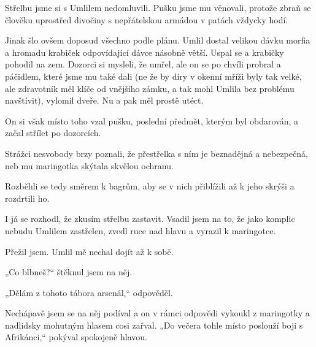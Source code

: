 	
 Střelbu jsme si s Umlilem nedomluvili. Pušku jsme mu věnovali, protože zbraň se člověku uprostřed divočiny s nepřátelskou armádou v patách vždycky hodí.
	
 Jinak šlo ovšem doposud všechno podle plánu. Umlil dostal velikou dávku morfia a hromadu krabiček odpovídající dávce násobně větší. Uspal se a krabičky pohodil na zem. Dozorci si mysleli, že umřel, ale on se po chvíli probral a páčidlem, které jsme mu také dali (ne že by díry v okenní mříži byly tak velké, ale zdravotník měl klíče od vnějšího zámku, a tak mohl Umlila bez problému navštívit), vylomil dveře. Nu a pak měl prostě utéct.

On si však místo toho vzal pušku, poslední předmět, kterým byl obdarován, a začal střílet po dozorcích.
	
 Strážci nesvobody brzy poznali, že přestřelka s ním je beznadějná a nebezpečná, neb mu maringotka skýtala skvělou ochranu.
	
 Rozběhli se tedy směrem k bagrům, aby se v nich přiblížili až k jeho skrýši a rozdrtili ho.

	
 I já se rozhodl, že zkusím střelbu zastavit. Vsadil jsem na to, že jako komplic nebudu Umlilem zastřelen, zvedl ruce nad hlavu a vyrazil k maringotce.
	
 Přežil jsem. Umlil mě nechal dojít až k sobě.
	
 „Co blbneš?“ štěknul jsem na něj.
	
 „Dělám z tohoto tábora arsenál,“ odpověděl.
	
 Nechápavě jsem se na něj podíval a on v rámci odpovědi vykoukl z maringotky a nadlidsky mohutným hlasem cosi zařval. „Do večera tohle místo poslouží boji s Afrikánci,“ pokýval spokojeně hlavou.
